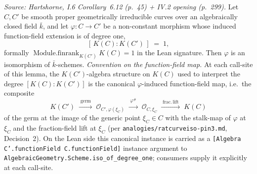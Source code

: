 \begin{lemma}


  \label{lem:degree_one_morphism_iso}
  \textit{Source: Hartshorne, I.6 Corollary~6.12 (p.~45) + IV.2 opening
  (p.~299).}
  Let \(C, C'\) be smooth proper geometrically irreducible curves over an
  algebraically closed field \(\bar k\), and let \(\varphi \colon C \to C'\) be
  a non-constant morphism whose induced function-field extension is of
  degree one,
  \[
    [\,K(C) : K(C')\,] \;=\; 1,
  \]
  formally
  \(\operatorname{Module.finrank}_{K(C')} K(C) = 1\) in the Lean signature.
  Then \(\varphi\) is an isomorphism of \(\bar k\)-schemes.
  \emph{Convention on the function-field map.} At each call-site of this
  lemma, the \(K(C')\)-algebra structure on \(K(C)\) used to interpret the
  degree \([K(C) : K(C')]\) is the canonical \(\varphi\)-induced
  function-field map, i.e.\ the composite
  \[
    K(C') \;\xrightarrow{\;\text{germ}\;}\;
    \mathcal O_{C', \varphi(\xi_C)}
    \;\xrightarrow{\;\varphi^\#\;}\;
    \mathcal O_{C, \xi_C}
    \;\xrightarrow{\;\text{frac.}\,\text{lift}\;}\; K(C)
  \]
  of the germ at the image of the generic point \(\xi_C \in C\) with the
  stalk-map of \(\varphi\) at \(\xi_C\) and the fraction-field lift at
  \(\xi_C\) (per \texttt{analogies/ratcurveiso-pin3.md}, Decision~2). On
  the Lean side this canonical instance is carried as a
  \texttt{[Algebra C'.functionField C.functionField]} instance argument
  to \texttt{AlgebraicGeometry.Scheme.iso\_of\_degree\_one}; consumers
  supply it explicitly at each call-site.
\end{lemma}
